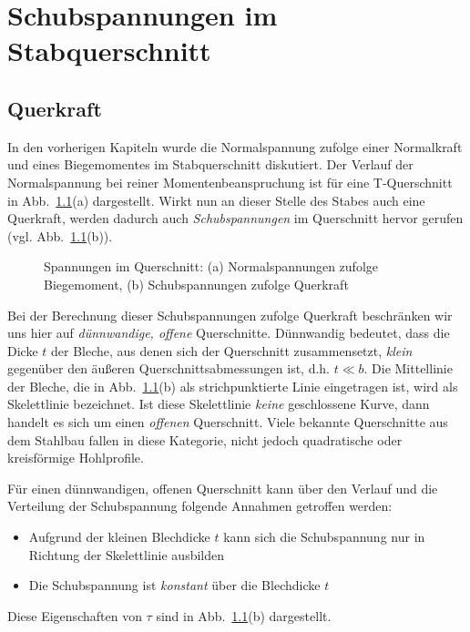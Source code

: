 
\chapter{Schubspannungen im Stabquerschnitt}

\section{Querkraft}

In den vorherigen Kapiteln wurde die Normalspannung zufolge einer Normalkraft und eines Biegemomentes im Stabquerschnitt diskutiert.
Der Verlauf der Normalspannung bei reiner Momentenbeanspruchung ist für eine T-Querschnitt in Abb.~\ref{fig:4-1}(a) dargestellt.
Wirkt nun an dieser Stelle des Stabes auch eine Querkraft, werden dadurch auch \emph{Schubspannungen} im Querschnitt hervor gerufen (vgl. Abb.~\ref{fig:4-1}(b)).
%
\begin{figure}[h!]
	\centering
	
	\caption{Spannungen im Querschnitt: (a) Normalspannungen zufolge Biegemoment, (b) Schubspannungen zufolge Querkraft}
	\label{fig:4-1}
\end{figure}
%

Bei der Berechnung dieser Schubspannungen zufolge Querkraft beschränken wir uns hier auf \emph{dünnwandige, offene} Querschnitte.
Dünnwandig bedeutet, dass die Dicke $t$ der Bleche, aus denen sich der Querschnitt zusammensetzt, \emph{klein} gegenüber den äußeren Querschnittsabmessungen ist, d.h. $t\ll b$.
Die Mittellinie der Bleche, die in Abb.~\ref{fig:4-1}(b) als strichpunktierte Linie eingetragen ist, wird als Skelettlinie bezeichnet.
Ist diese Skelettlinie \emph{keine} geschlossene Kurve, dann handelt es sich um einen \emph{offenen} Querschnitt.
Viele bekannte Querschnitte aus dem Stahlbau fallen in diese Kategorie, nicht jedoch quadratische oder kreisförmige Hohlprofile.

Für einen dünnwandigen, offenen Querschnitt kann über den Verlauf und die Verteilung der Schubspannung folgende Annahmen getroffen werden:
%
\begin{itemize}
	\item Aufgrund der kleinen Blechdicke $t$ kann sich die Schubspannung nur in Richtung der Skelettlinie ausbilden
	\item Die Schubspannung ist \emph{konstant} über die Blechdicke $t$ 
\end{itemize}
%
Diese Eigenschaften von $\tau$ sind in Abb.~\ref{fig:4-1}(b) dargestellt.


